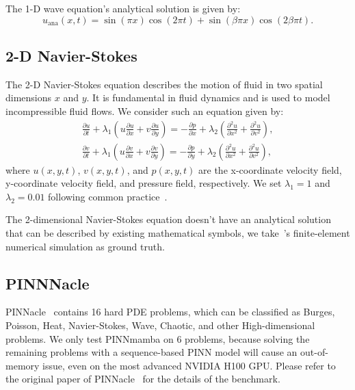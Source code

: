 \documentclass{article}
\theoremstyle{plain}
\theoremstyle{definition}
\theoremstyle{remark}
\begin{document}
The 1-D wave equation's analytical solution is given by:
\begin{equation}
    u_\text{ana}(x,t)=\sin(\pi x)\cos(2\pi t)+\sin(\beta \pi x)\cos(2\beta \pi t).
\end{equation}

\subsection{2-D Navier-Stokes}

The 2-D Navier-Stokes equation describes the motion of fluid in two spatial dimensions $x$ and $y$. It is fundamental in fluid dynamics and is used to model incompressible fluid flows. We consider such an equation given by:
\begin{gather}
    \frac{\partial u}{\partial t} + \lambda_1 (u\frac{\partial u}{\partial x} + v \frac{\partial u}{\partial y}) = - \frac{\partial p}{\partial x} + \lambda_2 (\frac{\partial^2 u}{\partial x^2} + \frac{\partial^2 u}{\partial v^2}), \nonumber \\
    \frac{\partial v}{\partial t} + \lambda_1 (u\frac{\partial v}{\partial x} + v \frac{\partial v}{\partial y}) = - \frac{\partial p}{\partial y} + \lambda_2 (\frac{\partial^2 u}{\partial x^2} + \frac{\partial^2 u}{\partial v^2}),
\end{gather}
where $u(x,y,t)$, $v(x,y,t)$, and $p(x,y,t)$ are the x-coordinate velocity field, y-coordinate velocity field, and pressure field, respectively. We set $\lambda_1 = 1$ and $\lambda_2 = 0.01$ following common practice~\cite{zhao2024pinnsformer,raissi2019physics}. 

The 2-dimensional Navier-Stokes equation doesn't have an analytical solution that can be described by existing mathematical symbols, we take~\citet{raissi2019physics}'s finite-element numerical simulation as ground truth. 

\subsection{PINNNacle}
PINNacle~\cite{hao2023pinnacle} contains 16 hard PDE problems, which can be classified as Burges, Poisson, Heat, Navier-Stokes, Wave, Chaotic, and other High-dimensional problems. We only test PINNmamba on 6 problems, because solving the remaining problems with a sequence-based PINN model will cause an out-of-memory issue, even on the most advanced NVIDIA H100 GPU. Please refer to the original paper of PINNacle~\cite{hao2023pinnacle} for the details of the benchmark.
\end{document}
